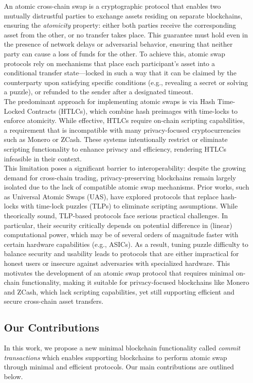 An atomic cross-chain swap is a cryptographic protocol that enables two mutually distrustful parties to exchange assets residing on separate blockchains, ensuring the \textit{atomicity} property: either both parties receive the corresponding asset from the other, or no transfer takes place. This guarantee must hold even in the presence of network delays or adversarial behavior, ensuring that neither party can cause a loss of funds for the other. To achieve this, atomic swap protocols rely on mechanisms that place each participant’s asset into a conditional transfer state—locked in such a way that it can be claimed by the counterparty upon satisfying specific conditions (e.g., revealing a secret or solving a puzzle), or refunded to the sender after a designated timeout. \\
The predominant approach for implementing atomic swaps is via Hash Time-Locked Contracts (HTLCs), which combine hash preimages with time-locks to enforce atomicity. While effective, HTLCs require on-chain scripting capabilities, a requirement that is incompatible with many privacy-focused cryptocurrencies such as Monero or ZCash. These systems intentionally restrict or eliminate scripting functionality to enhance privacy and efficiency, rendering HTLCs infeasible in their context. \\
This limitation poses a significant barrier to interoperability: despite the growing demand for cross-chain trading, privacy-preserving blockchains remain largely isolated due to the lack of compatible atomic swap mechanisms. Prior works, such as Universal Atomic Swaps (UAS), have explored protocols that replace hash-locks with time-lock puzzles (TLPs) to eliminate scripting assumptions. While theorically sound, TLP-based protocols face serious practical challenges. In particular, their security critically depends on potential difference in (linear) computational power, which may be of several orders of magnitude faster with certain hardware capabilities (e.g., ASICs). As a result, tuning puzzle difficulty to balance security and usability leads to protocols that are either impractical for honest users or insecure against adversaries with specialized hardware.
This motivates the development of an atomic swap protocol that requires minimal on-chain functionality, making it suitable for privacy-focused blockchains like Monero and ZCash, which lack scripting capabilities, yet still supporting efficient and secure cross-chain asset transfers.

\subsection{Our Contributions}
In this work, we propose a new minimal blockchain functionality called \emph{commit transactions} which enables supporting blockchains to perform atomic swap through minimal and efficient protocols. Our main contributions are outlined below.
